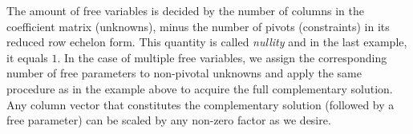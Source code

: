 The amount of free variables is decided by the number of columns in the coefficient matrix (unknowns), minus the number of pivots (constraints) in its reduced row echelon form. This quantity is called \textit{nullity} and in the last example, it equals $1$. In the case of multiple free variables, we assign the corresponding number of free parameters to non-pivotal unknowns and apply the same procedure as in the example above to acquire the full complementary solution. Any column vector that constitutes the complementary solution (followed by a free parameter) can be scaled by any non-zero factor as we desire.
